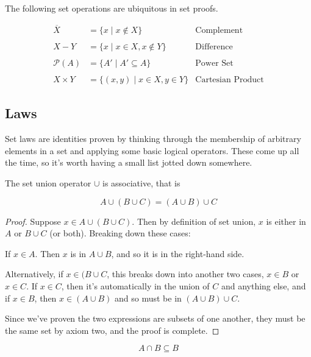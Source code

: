 \documentclass{standalone}
\begin{document}
The following set operations are ubiquitous in set proofs.

\begin{align*}
  \overline{X} &= \{ x \mid x \not \in X \}              &\text{Complement} \\\\
  X - Y &= \{ x \mid x \in X, x \not \in Y \}       &\text{Difference} \\\\
  \mathcal{P}(A) &= \{ A' \mid A' \subseteq A \}    &\text{Power Set} \\\\
  X \times Y &= \{ (x, y) \mid x \in X, y \in Y \}  &\text{Cartesian Product}
\end{align*}

\subsection{Laws}

Set laws are identities proven by thinking through the membership of arbitrary
elements in a set and applying some basic logical operators. These come up all
the time, so it's worth having a small list jotted down somewhere.

\begin{theorem}
  The set union operator $\cup$ is associative, that is

  \[
    A \cup (B \cup C) = (A \cup B) \cup C
  \]
\end{theorem}

\begin{proof}
  Suppose $x \in A \cup (B \cup C)$. Then by definition of set union, $x$ is
  either in $A$ or $B \cup C$ (or both). Breaking down these cases:

  If $x \in A$. Then $x$ is in $A \cup B$, and so it is in the right-hand side.

  Alternatively, if $x \in (B \cup C$, this breaks down into another two cases,
  $x \in B$ or $x \in C$. If $x \in C$, then it's automatically in the union of
  $C$ and anything else, and if $x \in B$, then $x \in (A \cup B)$ and so must
  be in $(A \cup B) \cup C$.

  Since we've proven the two expressions are subsets of one another, they must
  be the same set by axiom two, and the proof is complete.
\end{proof}

\begin{theorem}
  \[
    A \cap B \subseteq B
  \]
\end{theorem}
\end{document}
